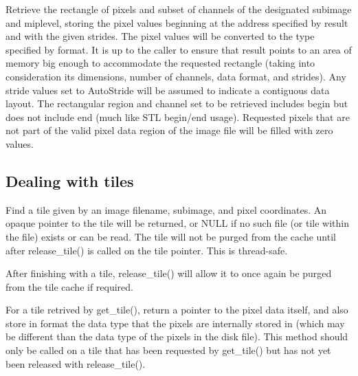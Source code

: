 Retrieve the rectangle of pixels and subset of channels
of the designated {\cf subimage} and {\cf miplevel}, storing the pixel values
beginning at the address specified by result and with the given strides.
The pixel values will be
converted to the type specified by {\cf format}.  It is up to the caller
to ensure that result points to an area of memory big enough to
accommodate the requested rectangle (taking into consideration its
dimensions, number of channels, data format, and strides).
Any stride values set to {\cf AutoStride} will be assumed to indicate
a contiguous data layout.
The rectangular region and channel set to be retrieved includes 
{\cf begin} but does not
include {\cf end} (much like STL begin/end usage).
Requested pixels that are not part of the valid pixel data region of the
image file will be filled with zero values.
\apiend


\subsection{Dealing with tiles}
\label{sec:imagecache:api:tiles}

Find a tile given by an image {\cf filename}, {\cf subimage}, and pixel
coordinates.  An opaque pointer to the tile will be returned,
or {\cf NULL} if no such file (or tile within the file) exists or can
be read.  The tile will not be purged from the cache until 
after {\cf release_tile()} is called on the tile pointer.  This is
thread-safe.
\apiend

After finishing with a tile, {\cf release_tile()} will allow it to 
once again be purged from the tile cache if required.
\apiend

For a tile retrived by {\cf get_tile()}, return a pointer to the
pixel data itself, and also store in {\cf format} the data type that
the pixels are internally stored in (which may be different than
the data type of the pixels in the disk file).  This method should
only be called on a tile that has been requested by 
{\cf get_tile()} but has not yet been released with {\cf release_tile()}.
\apiend

